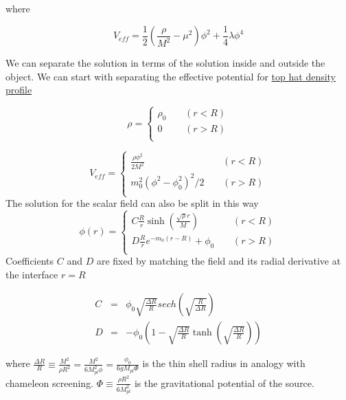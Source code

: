 \documentclass[aps,showpacs,onecolumn,floats,prd,superscriptaddress,nofootinbib]{revtex4-1}
\begin{document}
where 

\begin{equation}
	V_{eff} = \frac{1}{2} \left( \frac{\rho}{M^2} - \mu^2 \right) \phi^2 + \frac{1}{4} \lambda \phi^4
\end{equation}

We can separate the solution in terms of the solution inside and outside the object. We can start with separating the effective potential for \underline{top hat density profile}

\begin{equation}
	\rho=\begin{cases} \rho_0 & \ \ \ \ \ (r<R) \\
	0 & \ \ \ \ \ (r>R) \\
	\end{cases}
\end{equation}
	
\begin{equation}
V_{eff}= \begin{cases}
 \frac{\rho \phi^2}{2M^2} &\ \ \ \ \ (r<R)\\
m_0^2 (\phi^2-\phi_0^2)^2/2  & \ \ \ \ \ (r>R)	\\
\end{cases}
\end{equation}
The solution for the scalar field can also be split in this way
\begin{equation}
\phi(r)= \begin{cases}
 C \frac{R}{r} \sinh\left( \frac{\sqrt{\rho}r}{M} \right) &\ \ \ \ \ (r<R)\\
D \frac{R}{r} e^{-m_0(r-R)} + \phi_0 & \ \ \ \ \ (r>R)	\\
\end{cases}
\end{equation}
Coefficients $C$ and $D$ are fixed by matching the field and its radial derivative at the interface $r=R$

\begin{eqnarray}
	C & = & \phi_0 \sqrt{\frac{\Delta R}{R}} sech \left( \sqrt{\frac{R}{\Delta R}} \right)	\nonumber \\
	D & = & - \phi_0 \left(1 - \sqrt{\frac{\Delta R}{R}} \tanh \left( \sqrt{\frac{\Delta R}{R}}\right) \right)
\end{eqnarray}

where $\frac{\Delta R}{R} \equiv \frac{M^2}{\rho R^2} = \frac{M^2}{6 M_{pl}^2\phi} = \frac{\phi_0}{6gM_{pl} \Phi}$ is the thin shell radius in analogy with chameleon screening. $\Phi \equiv \frac{\rho R^2}{6 M_{pl}^2}$ is the gravitational potential of the source. 
\end{document}
